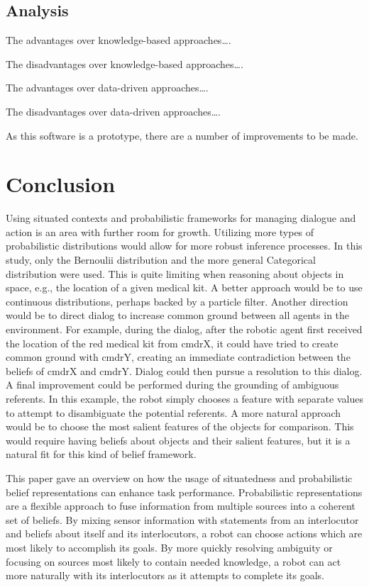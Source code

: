 \documentclass[12pt]{article}
\begin{document}
\subsection{Analysis}
\label{sec:analysis}
The advantages over knowledge-based approaches\dots.

The disadvantages over knowledge-based approaches\dots.

The advantages over data-driven approaches\dots.

The disadvantages over data-driven approaches\dots.

As this software is a prototype, there are a number of improvements to
be made.
\section{Conclusion}
\label{sec:conclusion}

Using situated contexts and probabilistic frameworks for managing
dialogue and action is an area with further room for growth.
Utilizing more types of probabilistic distributions would allow for
more robust inference processes. In this study, only the Bernoulii
distribution and the more general Categorical distribution were
used. This is quite limiting when reasoning about objects in space,
e.g., the location of a given medical kit. A better approach would be
to use continuous distributions, perhaps backed by a particle filter.
Another direction would be to direct dialog to increase common ground
between all agents in the environment. For example, during the dialog,
after the robotic agent first received the location of the red medical
kit from cmdrX, it could have tried to create common ground with
cmdrY, creating an immediate contradiction between the beliefs of
cmdrX and cmdrY. Dialog could then pursue a resolution to this
dialog. A final improvement could be performed during the grounding of
ambiguous referents. In this example, the robot simply chooses a
feature with separate values to attempt to disambiguate the potential
referents. A more natural approach would be to choose the most salient
features of the objects for comparison. This would require having
beliefs about objects and their salient features, but it is a natural
fit for this kind of belief framework.

This paper gave an overview on how the usage of situatedness and
probabilistic belief representations can enhance task
performance. Probabilistic representations are a flexible approach to
fuse information from multiple sources into a coherent set of
beliefs. By mixing sensor information with statements from an
interlocutor and beliefs about itself and its interlocutors, a robot
can choose actions which are most likely to accomplish its goals. By
more quickly resolving ambiguity or focusing on sources most likely to
contain needed knowledge, a robot can act more naturally with its
interlocutors as it attempts to complete its goals.

{\small }
\end{document}
